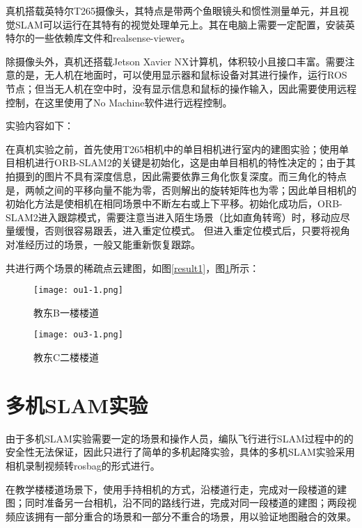 真机搭载英特尔T265摄像头，其特点是带两个鱼眼镜头和惯性测量单元，并且视觉SLAM可以运行在其特有的视觉处理单元上。其在电脑上需要一定配置，安装英特尔的一些依赖库文件和realsense-viewer。

除摄像头外，真机还搭载Jetson Xavier NX计算机，体积较小且接口丰富。需要注意的是，无人机在地面时，可以使用显示器和鼠标设备对其进行操作，运行ROS节点；但当无人机在空中时，没有显示信息和鼠标的操作输入，因此需要使用远程控制，在这里使用了No Machine软件进行远程控制。

实验内容如下：

在真机实验之前，首先使用T265相机中的单目相机进行室内的建图实验；使用单目相机进行ORB-SLAM2的关键是初始化，这是由单目相机的特性决定的；由于其拍摄到的图片不具有深度信息，因此需要依靠三角化恢复深度。而三角化的特点是，两帧之间的平移向量不能为零，否则解出的旋转矩阵也为零；因此单目相机的初始化方法是使相机在相同场景中不断左右或上下平移。初始化成功后，ORB-SLAM2进入跟踪模式，需要注意当进入陌生场景（比如直角转弯）时，移动应尽量缓慢，否则很容易跟丢，进入重定位模式。
但进入重定位模式后，只要将视角对准经历过的场景，一般又能重新恢复跟踪。

共进行两个场景的稀疏点云建图，如图\ref{result1}，图\ref{result2}所示：

\begin{figure}[htbp]
	\centering
	\begin{minipage}[t]{0.45\columnwidth} %
		\centering
		\texttt{[image: ou1-1.png]}
		\caption{教东B一楼楼道}
		\label{result1}
	\end{minipage}
	\begin{minipage}[t]{0.45\columnwidth}
		\centering
		\texttt{[image: ou3-1.png]}
		\caption{教东C二楼楼道}
		\label{result2}
	\end{minipage}
\end{figure}


\section{多机SLAM实验}

由于多机SLAM实验需要一定的场景和操作人员，编队飞行进行SLAM过程中的的安全性无法保证，因此只进行了简单的多机起降实验，具体的多机SLAM实验采用相机录制视频转rosbag的形式进行。

在教学楼楼道场景下，使用手持相机的方式，沿楼道行走，完成对一段楼道的建图；同时准备另一台相机，沿不同的路线行进，完成对同一段楼道的建图；两段视频应该拥有一部分重合的场景和一部分不重合的场景，用以验证地图融合的效果。

